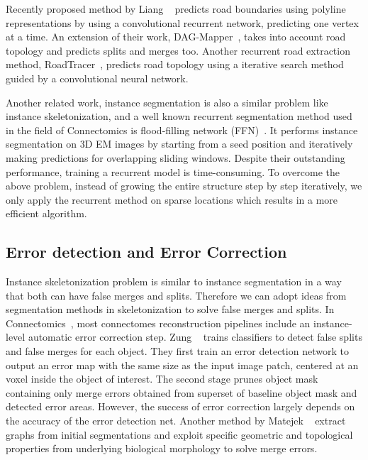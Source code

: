 Recently proposed method by Liang \etall~\cite{Liang2019} predicts road boundaries using polyline representations by using a convolutional recurrent network, predicting one vertex at a time. An extension of their work, DAG-Mapper~\cite{Homayounfar2019}, takes into account road topology and predicts splits and merges too. Another recurrent road extraction method, RoadTracer~\cite{Bastani2018}, predicts road topology using a iterative search method guided by a convolutional neural network. 

Another related work, instance segmentation is also a similar problem like instance skeletonization, and a well known recurrent segmentation method used in the field of Connectomics \cite{Turaga2010, Funke2019, Kisuk2017} is flood-filling network (FFN)~\cite{Januszewski2018FFN}. It performs instance segmentation on 3D EM images by starting from a seed position and iteratively making predictions for overlapping sliding windows. Despite their outstanding performance, training a recurrent model is time-consuming. To overcome the above problem, instead of growing the entire structure step by step iteratively, we only apply the recurrent method on sparse locations which results in a more efficient algorithm.


\subsection{Error detection and Error Correction}
Instance skeletonization problem is similar to instance segmentation in a way that both can have false merges and splits. Therefore we can adopt ideas from segmentation methods in skeletonization to solve false merges and splits. 
In Connectomics~\cite{Turaga2010, Funke2019, Kisuk2017}, most connectomes reconstruction pipelines include an instance-level automatic error correction step. Zung \etall~\cite{Seung2017} trains classifiers to detect false splits and false merges for each object. They first train an error detection network to output an error map with the same size as the input image patch, centered at an voxel inside the object of interest. The second stage prunes object mask containing only merge errors obtained from superset of baseline object mask and detected error areas. However, the success of error correction largely depends on the accuracy of the error detection net. Another method by Matejek \etall~\cite{Brain2019} extract graphs from initial segmentations and exploit specific geometric and topological properties from underlying biological morphology to solve merge errors.


